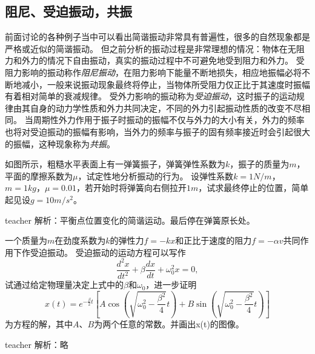 \subsection{阻尼、受迫振动，共振}
前面讨论的各种例子当中可以看出简谐振动非常具有普遍性，很多的自然现象都是严格或近似的简谐振动。
但之前分析的振动过程是非常理想的情况：物体在无阻力和外力的情况下自由振动，真实的振动过程中不可避免地受到阻力和外力。
受阻力影响的振动称作\emph{阻尼振动}，在阻力影响下能量不断地损失，相应地振幅必将不断地减小，一般来说振动现象最终将停止，当物体所受阻力仅正比于其速度时振幅有着相对简单的衰减规律。
受外力影响的振动称为\emph{受迫振动}，这时振子的运动规律由其自身的动力学性质和外力共同决定，不同的外力引起振动性质的改变不尽相同。
当周期性外力作用于振子时振动的振幅不仅与外力的大小有关，外力的频率也将对受迫振动的振幅有影响，当外力的频率与振子的固有频率接近时会引起很大的振幅，这种现象称为\emph{共振}。


\begin{example}
如图所示，粗糙水平表面上有一弹簧振子，弹簧弹性系数为$k$，振子的质量为$m$，平面的摩擦系数为$\mu$，试定性地分析振动的行为。
设弹性系数$k=1\unit{N/m}$，$m=1\unit{kg}$，$\mu=0.01$，若开始时将弹簧向右侧拉开$1\unit{m}$，试求最终停止的位置，简单起见设$g=10\unit{m/s^2}$。
\begin{taggedblock}{teacher}
\newline
解析：平衡点位置变化的简谐运动。最后停在弹簧原长处。
\end{taggedblock}
\end{example}


\begin{example}
一个质量为$m$在劲度系数为$k$的弹性力$f=-kx$和正比于速度的阻力$f=-\alpha v$共同作用下作受迫振动。
受迫振动的运动方程可以写作
\[
\frac{d^2x}{dt^2}+\beta\frac{dx}{dt}+\omega_0^2x=0,
\]
试通过给定物理量决定上式中的$\beta$和$\omega_0$，进一步证明
\[
x(t) = e^{-\frac{\beta}{2}t}\left[ A\cos\left(\sqrt{\omega_0^2-\frac{\beta^2}{4}}t\right)+B \sin\left(\sqrt{\omega_0^2-\frac{\beta^2}{4}}t\right) \right]
\]
为方程的解，其中$A$、$B$为两个任意的常数。并画出x(t)的图像。

\begin{taggedblock}{teacher}
\noindent
解析：略
\end{taggedblock}
\end{example}


